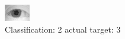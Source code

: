 \begin{figure}[h!]
\begin{center}
\includegraphics[width=0.60\columnwidth]{figures/ID1207_class_2_target_3.png}
\end{center}
\caption{ Classification: 2 actual target: 3}
\label{fig:ID1207_class_2_target_3}
\end{figure}
